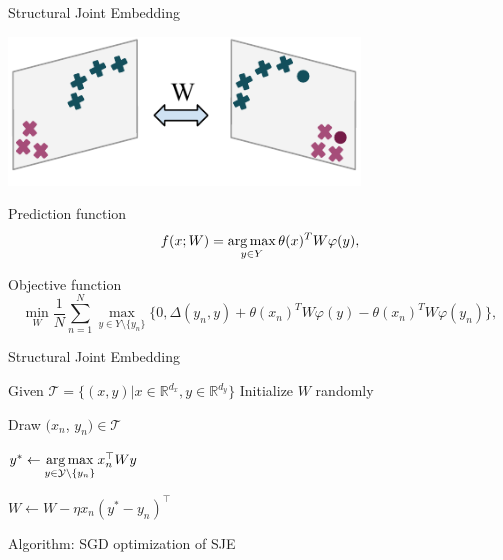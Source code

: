 \documentclass[mathserif, xcolor=table]{beamer}
\def\D{\Delta}
\def\T{\mathcal{T}}
\def\R{\mathbb{R}}
\def\Y{\mathcal{Y}}
\def\argmax{\mathop{\rm arg\,max}\limits}%
\def\Y{\mathcal{Y}}
\begin{document}

\begin{frame}{Structural Joint Embedding}
\begin{center}
\includegraphics[width=0.7\textwidth]{SJE}
\end{center}
\vspace{-4mm}
\pause

Prediction function
\begin{equation*}
f(x; W) = \argmax_{y\in Y} \theta(x)^T W \varphi(y), 
\end{equation*}
\pause

Objective function
\begin{equation*}
    \min_W \frac{1}{N} \sum_{n=1}^{N} \max_{y\in Y \setminus \{y_n\}} \{0, \D(y_n,y) + \theta(x_n)^T W \varphi(y)-\theta(x_n)^T W \varphi(y_n)\},
\end{equation*}

\end{frame}

\begin{frame}{Structural Joint Embedding}

\begin{algorithm}[H]
\begin{algorithmic}[1]
\STATE  Given $\T = \{(x, y)| x \in \R^{d_x}, y \in \R^{d_y}\}$ 
\STATE  Initialize $W$ randomly
\pause

\FOR{$n=1$ to $|\T|$}
     		\STATE  Draw $(x_n$, $y_n) \in \T$
     		\pause

     		\STATE $y^* \leftarrow \argmax\limits_{y \in \Y \setminus \{y_n\}} x_n^\top W y$
     		     		\pause

					\STATE	$W \leftarrow W - \eta x_n (y^* - y_n)^\top$ 
        		\ENDIF
\ENDFOR
\ENDFOR
\end{algorithmic}
\caption*{Algorithm: SGD optimization of SJE }
\label{alg:seq}
\end{algorithm}


\end{frame}
\end{document}
